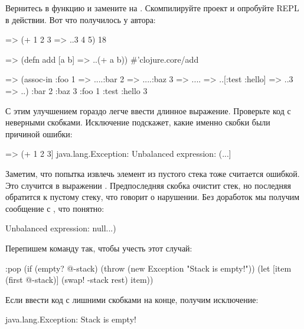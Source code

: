 Вернитесь в функцию  и замените  на . Скомпилируйте проект и опробуйте REPL в действии. Вот что получилось у автора:

\begin{english}
  \begin{clojure}
=> (+ 1 2 3
=> ..3 4 5)
18

=> (defn add [a b]
=> ..(+ a b))
#'clojure.core/add

=> (assoc-in {:foo 1
=> ....:bar 2
=> ....:baz 3
=> ....}
=> ..[:test :hello]
=> ..3
=> ..)
{:bar 2 :baz 3 :foo 1 :test {:hello 3}}
  \end{clojure}
\end{english}

С этим улучшением гораздо легче ввести длинное выражение. Проверьте код с неверными скобками. Исключение подскажет, какие именно скобки были причиной ошибки:

\begin{english}
  \begin{clojure}
=> (+ 1 2 3]
java.lang.Exception: Unbalanced expression: (...]
  \end{clojure}
\end{english}

Заметим, что попытка извлечь элемент из пустого стека тоже считается ошибкой. Это случится в выражении . Предпоследняя скобка очистит стек, но последняя обратится к пустому стеку, что говорит о нарушении. Без доработок мы получим сообщение с , что понятно:

\begin{english}
  \begin{clojure}
Unbalanced expression: null...)
  \end{clojure}
\end{english}

Перепишем команду  так, чтобы учесть этот случай:

\begin{english}
  \begin{clojure}
:pop (if (empty? @-stack)
       (throw (new Exception "Stack is empty!"))
       (let [item (first @-stack)]
         (swap! -stack rest)
         item))
  \end{clojure}
\end{english}

Если ввести код с лишними скобками на конце, получим исключение:

\begin{english}
  \begin{text}
java.lang.Exception: Stack is empty!
  \end{text}
\end{english}

